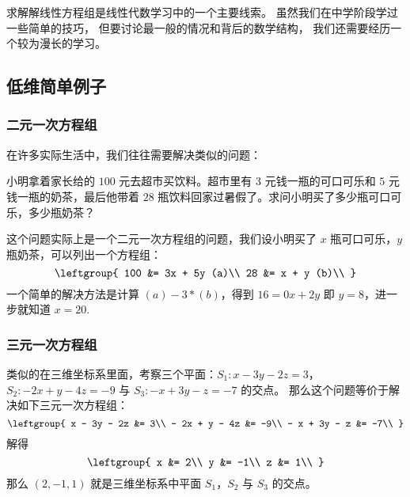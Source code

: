 

求解解线性方程组是线性代数学习中的一个主要线索。 虽然我们在中学阶段学过一些简单的技巧， 但要讨论最一般的情况和背后的数学结构， 我们还需要经历一个较为漫长的学习。

\subsection{低维简单例子}
\subsubsection{二元一次方程组}
在许多实际生活中，我们往往需要解决类似的问题：

小明拿着家长给的 $100$ 元去超市买饮料。超市里有 $3$ 元钱一瓶的可口可乐和 $5$ 元钱一瓶的奶茶，最后他带着 $28$ 瓶饮料回家过暑假了。求问小明买了多少瓶可口可乐，多少瓶奶茶？

这个问题实际上是一个二元一次方程组的问题，我们设小明买了 $x$ 瓶可口可乐，$y$ 瓶奶茶，可以列出一个方程组：\begin{equation}
\leftgroup{
100 &= 3x + 5y (a)\\
28 &= x + y (b)\\
}\end{equation}
一个简单的解决方法是计算 $(a)-3*(b)$，得到 $16 = 0x + 2y$ 即 $y = 8$，进一步就知道 $x = 20$.

\subsubsection{三元一次方程组}
类似的在三维坐标系里面，考察三个平面：$S_1:x - 3y-2z=3$，$S_2:-2x+y-4z=-9$ 与 $S_3:-x+3y-z=-7$ 的交点。
那么这个问题等价于解决如下三元一次方程组：\begin{equation}
\leftgroup{
x - 3y - 2z &= 3\\
- 2x + y - 4z &= -9\\
- x + 3y - z &= -7\\
}\end{equation}
解得\begin{equation}
\leftgroup{
x &= 2\\
y &= -1\\
z &= 1\\
}\end{equation}
那么 $(2,-1,1)$ 就是三维坐标系中平面 $S_1$，$S_2$ 与 $S_3$ 的交点。
